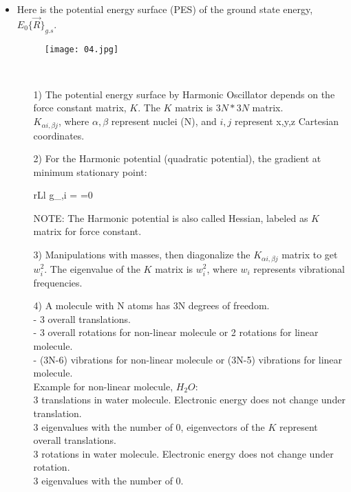 \documentclass[a4paper, 12pt]{article}
\begin{document}
\begin{itemize}
	\item Here is the potential energy surface (PES) of the ground state energy, $E_0\{\vec{R}\}_{g.s}$.\\
	\begin{figure}[htp]
    \centering
    \texttt{[image: 04.jpg]}
	\end{figure}\\
	\begin{itemize}
	\item[1)] The potential energy surface by Harmonic Oscillator depends on the force constant matrix, $K$. The $K$ matrix is $3N \ast 3N$ matrix. \\
	$K_{\alpha i,\beta j}$, where $\alpha, \beta$ represent nuclei (N), and $i,j$ represent x,y,z Cartesian coordinates.
	\item[2)] For the Harmonic potential (quadratic potential), the gradient at minimum stationary point:
	\begin{IEEEeqnarray}{rLl} 
	 g_{\alpha,i} = =0 
	\end{IEEEeqnarray}
 NOTE: The Harmonic potential is also called Hessian, labeled as $K$ matrix for force constant.
 	\item[3)] Manipulations with masses, then diagonalize the $K_{\alpha i,\beta j}$ matrix to get $w_i^2$. The eigenvalue of the $K$ matrix is $w_i^2$, where $w_i$ represents vibrational frequencies.
 	\item[4)] A molecule with N atoms has 3N degrees of freedom.\\
 	- 3 overall translations.\\
 	- 3 overall rotations for non-linear molecule or 2 rotations for linear molecule.\\
 	- (3N-6) vibrations for non-linear molecule or (3N-5) vibrations for linear molecule.\\
 	
 	
	Example for non-linear molecule, $H_2O$:\\
	3 translations in water molecule. Electronic energy does not change under translation.\\
	3 eigenvalues with the number of 0, eigenvectors of the $K$ represent overall translations.\\
	3 rotations in water molecule. Electronic energy does not change under rotation.\\
	3 eigenvalues with the number of 0.\\
	

\end{itemize}
\end{itemize}
\end{document}
